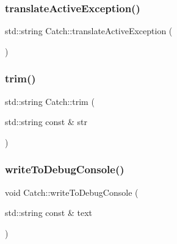 \hypertarget{namespace_catch_adafff91485eeeeb9e9333f317cc0e3b1}{}\label{namespace_catch_adafff91485eeeeb9e9333f317cc0e3b1} 
\subsubsection{\texorpdfstring{translate\+Active\+Exception()}{translateActiveException()}}
{\footnotesize\ttfamily std\+::string Catch\+::translate\+Active\+Exception (\begin{DoxyParamCaption}{ }\end{DoxyParamCaption})}

\hypertarget{namespace_catch_a084108b47f37d8bfd5db51c50c7451b3}{}\label{namespace_catch_a084108b47f37d8bfd5db51c50c7451b3} 
\subsubsection{\texorpdfstring{trim()}{trim()}}
{\footnotesize\ttfamily std\+::string Catch\+::trim (\begin{DoxyParamCaption}\item[{std\+::string const \&}]{str }\end{DoxyParamCaption})}

\hypertarget{namespace_catch_aa5dcf4750ce9a854f4b74d3c952d13cc}{}\label{namespace_catch_aa5dcf4750ce9a854f4b74d3c952d13cc} 
\subsubsection{\texorpdfstring{write\+To\+Debug\+Console()}{writeToDebugConsole()}}
{\footnotesize\ttfamily void Catch\+::write\+To\+Debug\+Console (\begin{DoxyParamCaption}\item[{std\+::string const \&}]{text }\end{DoxyParamCaption})}


